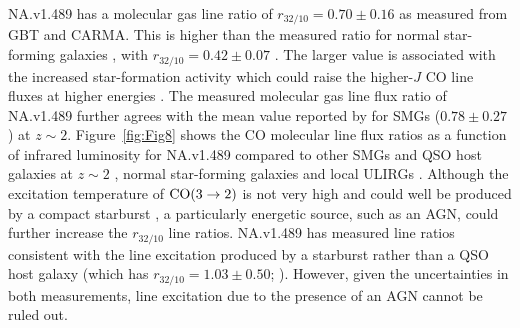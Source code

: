 \documentclass[iop,apj,useAMS,usenatbib]{emulateapj-rtx4}
\begin{document}
NA.v1.489 has a molecular gas line ratio of $r_{32/10}=0.70\pm0.16$ as
measured from GBT and CARMA. This is higher than the measured
  ratio for normal star-forming galaxies \citep{Aravena2014, Daddi2015},
  with $r_{32/10}=0.42\pm0.07$ \citep{Daddi2015}. The larger value is associated with the
increased star-formation activity which could raise the higher-$J$ CO
line fluxes at higher energies \citep{Bolatto2013}. The measured molecular gas line
flux ratio of NA.v1.489 further agrees with the mean
value reported by \citet{Sharon2016} for SMGs ($0.78\pm0.27$) at
$z\sim2$. Figure~\ref{fig:Fig8} shows
the CO molecular line flux ratios as a function of infrared luminosity
for NA.v1.489 compared to other SMGs and QSO host galaxies at $z\sim2$
\citep{Sharon2016}, normal star-forming galaxies \citep{Aravena2014,
  Daddi2015} and local ULIRGs \citep{Papadopoulos2012}. Although the
excitation temperature of $\rm {CO (3\rightarrow2)}$ is not very high
and could well be produced by a compact starburst \citep{Sharon2016}, a particularly
energetic source, such as an AGN, could further increase the
$r_{32/10}$ line ratios. NA.v1.489 has measured line ratios consistent
with the line excitation produced by a starburst rather than a QSO host
galaxy (which has $r_{32/10}=1.03\pm0.50$; \citealp{Sharon2016}). However,
given the uncertainties in both measurements, line excitation due to the
presence of an AGN cannot be ruled out.
\end{document}
